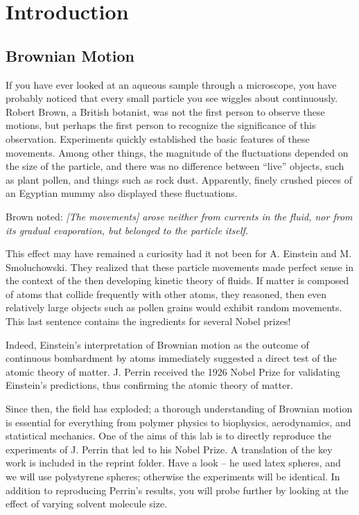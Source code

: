 \documentclass{../lab}
\begin{document}
\section{Introduction}

\subsection{Brownian Motion}

If you have ever looked at an aqueous sample through a microscope, you have probably noticed that every small particle you see wiggles about continuously. Robert Brown, a British botanist, was not the first person to observe these motions, but perhaps the first person to recognize the significance of this observation. Experiments quickly established the basic features of these movements. Among other things, the magnitude of the fluctuations depended on the size of the particle, and there was no difference between ``live'' objects, such as plant pollen, and things such as rock dust. Apparently, finely crushed pieces of an Egyptian mummy also displayed these fluctuations.

Brown noted: \emph{[The movements] arose neither from currents in the fluid, nor from its gradual evaporation, but belonged to the particle itself.}

This effect may have remained a curiosity had it not been for A. Einstein and M. Smoluchowski. They realized that these particle movements made perfect sense in the context of the then developing kinetic theory of fluids. If matter is composed of atoms that collide frequently with other atoms, they reasoned, then even relatively large objects such as pollen grains would exhibit random movements. This last sentence contains the ingredients for several Nobel prizes!

Indeed, Einstein's interpretation of Brownian motion as the outcome of continuous bombardment by atoms immediately suggested a direct test of the atomic theory of matter. J. Perrin received the 1926 Nobel Prize for validating Einstein's predictions, thus confirming the atomic theory of matter.

Since then, the field has exploded; a thorough understanding of Brownian motion is essential for everything from polymer physics to biophysics, aerodynamics, and statistical mechanics. One of the aims of this lab is to directly reproduce the experiments of J. Perrin that led to his Nobel Prize. A translation of the key work is included in the reprint folder. Have a look -- he used latex spheres, and we will use polystyrene spheres; otherwise the experiments will be identical. In addition to reproducing Perrin's results, you will probe further by looking at the effect of varying solvent molecule size.
\end{document}
